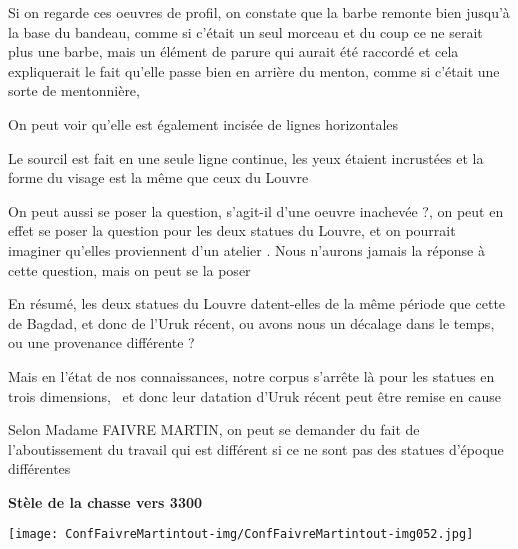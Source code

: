 \documentclass[a4paper]{article}
\begin{document}
\bigskip

{
Si on regarde ces oeuvres de profil, on constate que la barbe remonte
bien jusqu'à la base du bandeau, comme si c'était un seul morceau et du
coup ce ne serait plus une barbe, mais un élément de parure qui aurait
été raccordé et cela expliquerait le fait qu'elle passe bien en arrière
du menton, comme si c'était une sorte de mentonnière,}

{
On peut voir qu'elle est également incisée de lignes horizontales}

{
Le sourcil est fait en une seule ligne continue, les yeux étaient
incrustées et la forme du visage est la même que ceux du Louvre}


\bigskip

{
On peut aussi se poser la question, s'agit-il d'une oeuvre inachevée ?,
on peut en effet se poser la question pour les deux statues du Louvre,
et on pourrait imaginer qu'elles proviennent d'un atelier . Nous
n'aurons jamais la réponse à cette question, mais on peut se la poser}


\bigskip

{
En résumé, les deux statues du Louvre datent-elles de la même période
que cette de Bagdad, et donc de l'Uruk récent, ou avons nous un
décalage dans le temps, ou une provenance différente ?}

{
Mais en l'état de nos connaissances, notre corpus s'arrête là pour les
statues en trois dimensions, \ et donc leur datation d'Uruk récent peut
être remise en cause }

{
Selon Madame FAIVRE MARTIN, on peut se demander du fait de
l'aboutissement du travail qui est différent si ce ne sont pas des
statues d'époque différentes}


\bigskip


\bigskip

{
\textbf{Stèle de la chasse vers 3300}}


\bigskip


\bigskip


\bigskip


\texttt{[image: ConfFaivreMartintout-img/ConfFaivreMartintout-img052.jpg]}



\bigskip


\bigskip


\bigskip
\end{document}
